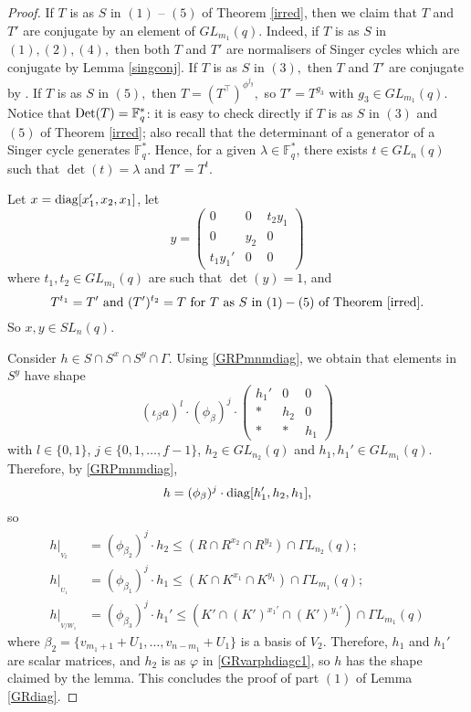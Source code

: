 \begin{proof}
If $T$ is as $S$ in  $(1)$ -- $(5)$ of Theorem \ref{irred}, then we claim that $T$ and $T'$ are conjugate by an element of $GL_{m_1}(q).$ Indeed, if $T$ is as $S$ in  $(1), (2) , (4),$ then both $T$ and $T'$ are normalisers of Singer cycles which are conjugate by Lemma \ref{singconj}. If $T$ is as $S$ in  $(3),$ then $T$ and $T'$ are conjugate by \cite[\S 21, Theorem 6 $(1)$]{sup}.  If $T$ is as $S$ in  $(5),$ then $T=(T^{\top})^{\phi^{j_g}},$ so $T'=T^{g_3}$ with $g_3 \in GL_{m_1}(q).$ Notice that $\mathrm{Det}(T)=\mathbb{F}_q^*$:  it is easy to check directly if $T$ is as $S$ in $(3)$ and $(5)$ of Theorem \ref{irred}; also recall that the determinant of a generator of a Singer cycle generates  $\mathbb{F}_q^*$. Hence, for a given $\lambda \in \mathbb{F}_q^*$, there exists $t \in GL_n(q)$ such that $\det(t)= \lambda$ and $T'=T^t.$



Let $x= \mathrm{diag}[x_1', x_2, x_1]$, let 
$$y=
\begin{pmatrix}
0 & 0 & t_2 y_1 \\
0 & y_2 & 0 \\
t_1 y_1'& 0 & 0
\end{pmatrix}$$
where $t_1, t_2 \in GL_{m_1}(q)$ are such that $\det(y)=1$, and 
$$T^{t_1}=T' \text{ and } (T')^{t_2}=T \text{ for } T \text{ as } S \text{ in } (1)-(5) \text{ of Theorem \ref{irred}.}$$
 So $x,y \in SL_n(q).$ 

Consider $h \in S \cap S^x \cap S^y \cap \Gamma.$ Using \eqref{GRPmnmdiag}, we obtain that elements in $S^y$ have shape 
\begin{equation}
\label{GRSy}
(\iota_{\beta} a)^l \cdot (\phi_{\beta})^j \cdot 
\begin{pmatrix}
h_1' & 0 & 0\\
 *   & h_2 & 0\\
 *   & * & h_1
\end{pmatrix}
\end{equation}
with $l \in \{0,1\}$, $j \in \{0, 1, \ldots, f-1\}$, $h_2 \in GL_{n_2}(q)$ and $h_1, h_1' \in GL_{m_1}(q).$ Therefore,  
by \eqref{GRPmnmdiag},
$$h= (\phi_{\beta})^j \cdot \mathrm{diag}[h_1',h_2,h_1],$$ so
\begin{align*}
h|_{_{V_2}} & =(\phi_{\beta_2})^j \cdot h_2 \le (R \cap R^{x_2} \cap R^{y_2}) \cap \Gamma L_{n_2}(q);\\  
h|_{_{U_1}} & =(\phi_{\beta_1})^j \cdot h_1 \le (K \cap K^{x_1} \cap K^{y_1}) \cap \Gamma L_{m_1}(q);\\
h|_{_{V/W_1}} & =(\phi_{\beta_3})^j \cdot h_1' \le (K' \cap (K')^{x_1'} \cap (K')^{y_1'}) \cap \Gamma L_{m_1}(q)
\end{align*} 
where $\beta_2=\{v_{m_1+1} +U_1, \ldots, v_{n-m_1}+U_1\}$ is a basis of $V_2.$ Therefore, $h_1$ and $h_1'$ are scalar matrices, and  $h_2$ is as $\varphi$ in \eqref{GRvarphdiagc1}, so $h$ has the shape claimed by the lemma.
 This concludes the proof of part $(1)$ of Lemma \ref{GRdiag}.


\end{proof}
